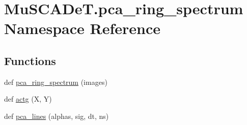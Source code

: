 \hypertarget{namespace_mu_s_c_a_de_t_1_1pca__ring__spectrum}{}\section{Mu\+S\+C\+A\+De\+T.\+pca\+\_\+ring\+\_\+spectrum Namespace Reference}
\label{namespace_mu_s_c_a_de_t_1_1pca__ring__spectrum}
\subsection*{Functions}
\begin{DoxyCompactItemize}
\item 
def \hyperlink{namespace_mu_s_c_a_de_t_1_1pca__ring__spectrum_a7ef33aad5190c8e10e7871b451ac18e0}{pca\+\_\+ring\+\_\+spectrum} (images)
\item 
def \hyperlink{namespace_mu_s_c_a_de_t_1_1pca__ring__spectrum_a9cd239ef49f7b4944ce1b00176f8a79f}{actg} (X, Y)
\item 
def \hyperlink{namespace_mu_s_c_a_de_t_1_1pca__ring__spectrum_af879a3db6e297f5019d84903806d8ac2}{pca\+\_\+lines} (alphas, sig, dt, ns)
\end{DoxyCompactItemize}
